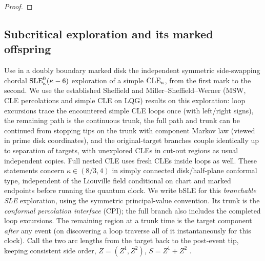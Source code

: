 \begin{proof}
\end{proof}

\subsection{Subcritical exploration and its marked offspring}\label{proxy:one-branch}

Use in a doubly boundary marked disk the independent symmetric side-swapping chordal \({\rm SLE}^0_\kappa(\kappa-6)\) exploration of a simple \({\rm CLE}_\kappa\), from the first mark to the second.
We use the established Sheffield and Miller--Sheffield--Werner (MSW, CLE percolations and simple CLE on LQG) results on this exploration: loop excursions trace the encountered simple CLE loops once (with left/right signs), the remaining path is the continuous trunk, the full path and trunk can be continued from stopping tips on the trunk with component Markov law (viewed in prime disk coordinates), and the original-target branches couple identically up to separation of targets, with unexplored CLEs in cut-out regions as usual independent copies.
Full nested CLE uses fresh CLEs inside loops as well.
These statements concern \(\kappa\in(8/3,4)\) in simply connected disk/half-plane conformal type, independent of the Liouville field conditional on chart and marked endpoints before running the quantum clock.
We write bSLE for this \emph{branchable SLE} exploration, using the symmetric principal-value convention. Its trunk is the \emph{conformal percolation interface} (CPI); the full branch also includes the completed loop excursions.
The remaining region at a trunk time is the target component \emph{after} any event (on discovering a loop traverse all of it instantaneously for this clock).
Call the two arc lengths from the target back to the post-event tip, keeping consistent side order, \(Z=(Z^1,Z^2)\), \(S=Z^1+Z^2\) \citep{MSWTrunk,MSWQuantum}.

